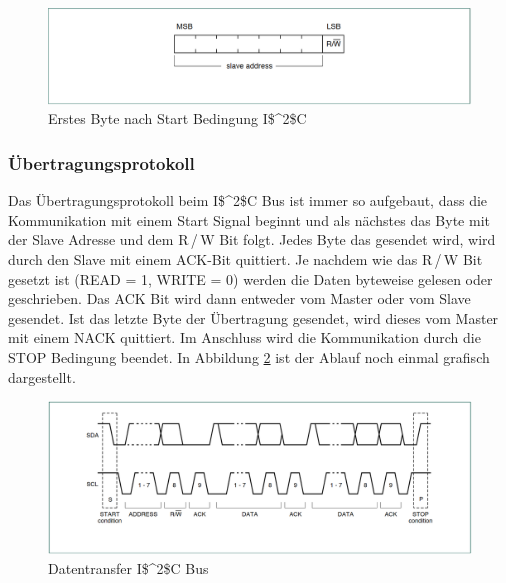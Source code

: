 \begin{figure}[!h] 
  \centering
     \includegraphics[scale=.65]{BilderAllgemein/I2C_slave_address.png}
  \caption{Erstes Byte nach Start Bedingung \ac{I$^2$C}  \citep[S. 13]{I2C_Datenblatt}}
  \label{Abb_Bild_I2C_Slave_Adresse}
\end{figure}

\subsubsection*{Übertragungsprotokoll}
\label{subsubsection_Übertragungsprotokoll_I2C}
Das Übertragungsprotokoll beim \ac{I$^2$C} Bus ist immer so aufgebaut, dass die Kommunikation mit einem Start Signal beginnt und als nächstes das Byte mit der Slave Adresse und dem R\,/\,W Bit folgt. Jedes Byte das gesendet wird, wird durch den Slave mit einem ACK-Bit quittiert. Je nachdem wie das R\,/\,W Bit gesetzt ist (READ = 1, WRITE = 0) werden die Daten byteweise gelesen oder geschrieben. Das ACK Bit wird dann entweder vom Master oder vom Slave gesendet. Ist das letzte Byte der Übertragung gesendet, wird dieses vom Master mit einem NACK quittiert. Im Anschluss wird die Kommunikation durch die STOP Bedingung beendet. In Abbildung \ref{Abb_Bild_I2C_Slave_Adresse} ist der Ablauf noch einmal grafisch dargestellt.

\begin{figure}[h!] 
  \centering
     \includegraphics[scale=.53]{BilderAllgemein/I2C_data_transfer.png}
  \caption{Datentransfer \ac{I$^2$C} Bus  \citep[S. 13]{I2C_Datenblatt}}
  \label{Abb_Bild_I2C_Slave_Adresse}
\end{figure}
\newpage

